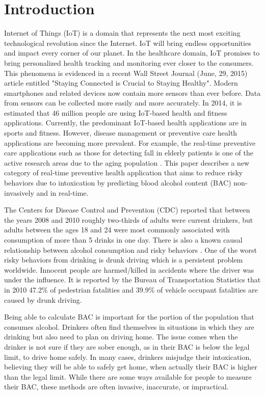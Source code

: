 \section{Introduction}

Internet of Things (IoT) is a domain that represents the next most exciting technological revolution since the Internet. IoT will bring endless opportunities and impact every corner of our planet. In the healthcare domain, IoT promises to bring personalized health tracking and monitoring ever closer to the consumers. This phenomena is evidenced in a recent Wall Street Journal (June, 29, 2015) article entitled "Staying Connected is Crucial to Staying Healthy". Modern smartphones and related devices now contain more sensors than ever before. Data from sensors can be collected more easily and more accurately. In 2014, it is estimated that 46 million people are using IoT-based health and fitness applications. Currently, the predominant IoT-based health applications are in sports and fitness. However, disease management or preventive care health applications are becoming more prevalent. For example, the real-time preventive care applications such as those for detecting fall in elderly patients is one of the active research areas due to the aging population \cite{Tacconi:2011}. This paper describes a new category of real-time preventive health application that aims to reduce risky behaviors due to intoxication by predicting blood alcohol content (BAC) non-invasively and in real-time.

The Centers for Disease Control and Prevention (CDC) reported \cite{Schoenborn:2013} that between the years 2008 and 2010 roughly two-thirds of adults were current drinkers, but adults between the ages 18 and 24 were most commonly associated with consumption of more than 5 drinks in one day. There is also a known causal relationship between alcohol consumption and risky behaviors \cite{Assaad:2006}. One of the worst risky behaviors from drinking is drunk driving which is a persistent problem worldwide. Innocent people are harmed/killed in accidents where the driver was under the influence. It is reported by the Bureau of Transportation Statistics \cite{Chambers:2012} that in 2010 47.2\% of pedestrian fatalities and 39.9\% of vehicle occupant fatalities are caused by drunk driving.

Being able to calculate BAC is important for the portion of the population that consumes alcohol. Drinkers often find themselves in situations in which they are drinking but also need to plan on driving home. The issue comes when the drinker is not sure if they are sober enough, as in their BAC is below the legal limit, to drive home safely. In many cases, drinkers misjudge their intoxication, believing they will be able to safely get home, when actually their BAC is higher than the legal limit. While there are some ways available for people to measure their BAC, these methods are often invasive, inaccurate, or impractical. 


